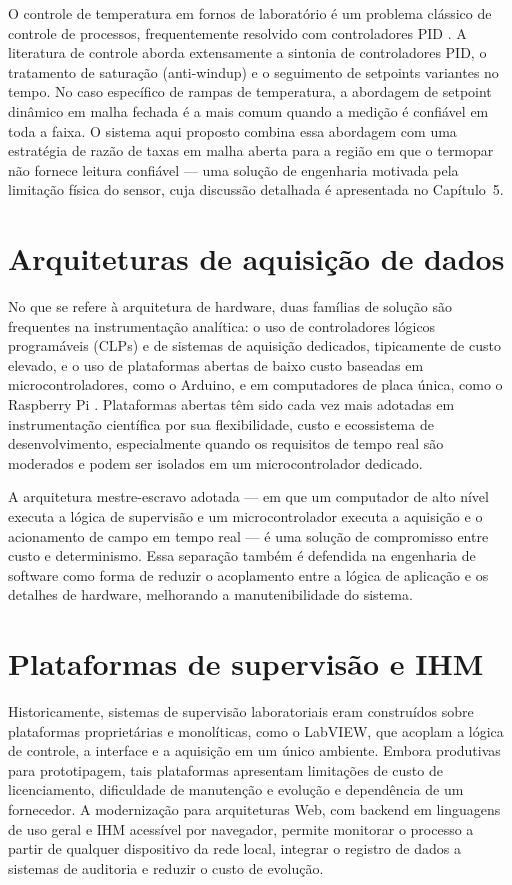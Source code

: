 O controle de temperatura em fornos de laboratório é um problema clássico de
controle de processos, frequentemente resolvido com controladores PID
\cite{astrom2006, ogata2010}. A literatura de controle aborda extensamente a
sintonia de controladores PID, o tratamento de saturação (anti-windup) e o
seguimento de setpoints variantes no tempo. No caso específico de rampas de
temperatura, a abordagem de setpoint dinâmico em malha fechada é a mais comum
quando a medição é confiável em toda a faixa. O sistema aqui proposto combina
essa abordagem com uma estratégia de razão de taxas em malha aberta para a
região em que o termopar não fornece leitura confiável --- uma solução de
engenharia motivada pela limitação física do sensor, cuja discussão detalhada é
apresentada no Capítulo~5.

\section{Arquiteturas de aquisição de dados}

No que se refere à arquitetura de hardware, duas famílias de solução são
frequentes na instrumentação analítica: o uso de controladores lógicos
programáveis (CLPs) e de sistemas de aquisição dedicados, tipicamente de custo
elevado, e o uso de plataformas abertas de baixo custo baseadas em
microcontroladores, como o Arduino, e em computadores de placa única, como o
Raspberry Pi \cite{arduino, raspberrypi}. Plataformas abertas têm sido cada vez
mais adotadas em instrumentação científica por sua flexibilidade, custo e
ecossistema de desenvolvimento, especialmente quando os requisitos de tempo real
são moderados e podem ser isolados em um microcontrolador dedicado.

A arquitetura mestre-escravo adotada --- em que um computador de alto nível
executa a lógica de supervisão e um microcontrolador executa a aquisição e o
acionamento de campo em tempo real --- é uma solução de compromisso entre custo
e determinismo. Essa separação também é defendida na engenharia de software
como forma de reduzir o acoplamento entre a lógica de aplicação e os detalhes de
hardware, melhorando a manutenibilidade do sistema.

\section{Plataformas de supervisão e IHM}

Historicamente, sistemas de supervisão laboratoriais eram construídos sobre
plataformas proprietárias e monolíticas, como o LabVIEW, que acoplam a lógica de
controle, a interface e a aquisição em um único ambiente. Embora produtivas para
prototipagem, tais plataformas apresentam limitações de custo de licenciamento,
dificuldade de manutenção e evolução e dependência de um fornecedor. A
modernização para arquiteturas Web, com backend em linguagens de uso geral e
IHM acessível por navegador, permite monitorar o processo a partir de qualquer
dispositivo da rede local, integrar o registro de dados a sistemas de auditoria
e reduzir o custo de evolução.

